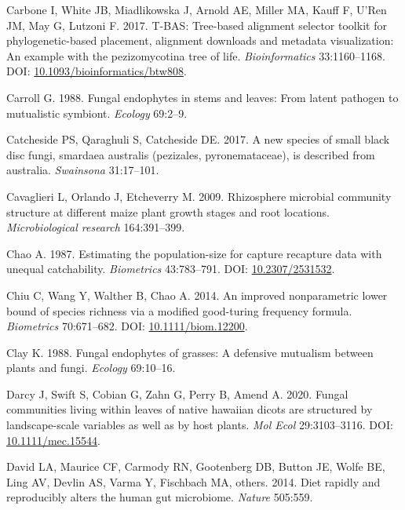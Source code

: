 \documentclass[fleqn,10pt,lineno]{wlpeerj} %
\newlength{\cslhangindent}
\newenvironment{CSLReferences}[2] %
 {%
  \setlength{\parindent}{0pt}
  \ifodd #1 \everypar{\setlength{\hangindent}{\cslhangindent}}\ignorespaces\fi
  \ifnum #2 > 0
  \setlength{\parskip}{#2\baselineskip}
  \fi
 }%
 {}
\begin{document}
\begin{CSLReferences}{1}{0}
\leavevmode{}%
Carbone I, White JB, Miadlikowska J, Arnold AE, Miller MA, Kauff F, U'Ren JM, May G, Lutzoni F. 2017. T-BAS: Tree-based alignment selector toolkit for phylogenetic-based placement, alignment downloads and metadata visualization: An example with the pezizomycotina tree of life. \emph{Bioinformatics} 33:1160--1168. DOI: \href{https://doi.org/10.1093/bioinformatics/btw808}{10.1093/bioinformatics/btw808}.

\leavevmode{}%
Carroll G. 1988. Fungal endophytes in stems and leaves: From latent pathogen to mutualistic symbiont. \emph{Ecology} 69:2--9.

\leavevmode{}%
Catcheside PS, Qaraghuli S, Catcheside DE. 2017. A new species of small black disc fungi, smardaea australis (pezizales, pyronemataceae), is described from australia. \emph{Swainsona} 31:17--101.

\leavevmode{}%
Cavaglieri L, Orlando J, Etcheverry M. 2009. Rhizosphere microbial community structure at different maize plant growth stages and root locations. \emph{Microbiological research} 164:391--399.

\leavevmode{}%
Chao A. 1987. Estimating the population-size for capture recapture data with unequal catchability. \emph{Biometrics} 43:783--791. DOI: \href{https://doi.org/10.2307/2531532}{10.2307/2531532}.

\leavevmode{}%
Chiu C, Wang Y, Walther B, Chao A. 2014. An improved nonparametric lower bound of species richness via a modified good-turing frequency formula. \emph{Biometrics} 70:671--682. DOI: \href{https://doi.org/10.1111/biom.12200}{10.1111/biom.12200}.

\leavevmode{}%
Clay K. 1988. Fungal endophytes of grasses: A defensive mutualism between plants and fungi. \emph{Ecology} 69:10--16.

\leavevmode{}%
Darcy J, Swift S, Cobian G, Zahn G, Perry B, Amend A. 2020. Fungal communities living within leaves of native hawaiian dicots are structured by landscape-scale variables as well as by host plants. \emph{Mol Ecol} 29:3103--3116. DOI: \href{https://doi.org/10.1111/mec.15544}{10.1111/mec.15544}.

\leavevmode{}%
David LA, Maurice CF, Carmody RN, Gootenberg DB, Button JE, Wolfe BE, Ling AV, Devlin AS, Varma Y, Fischbach MA, others. 2014. Diet rapidly and reproducibly alters the human gut microbiome. \emph{Nature} 505:559.


\end{CSLReferences}
\end{document}
